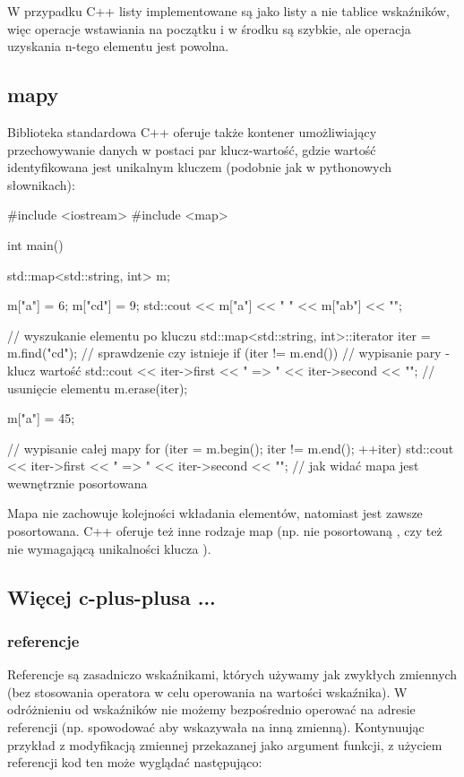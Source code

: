 W przypadku C++ listy implementowane są jako listy a nie tablice wskaźników, więc operacje wstawiania na początku i w środku są szybkie, ale operacja uzyskania n-tego elementu jest powolna.

\subsection{mapy}

Biblioteka standardowa C++ oferuje także kontener umożliwiający przechowywanie danych w postaci par klucz-wartość, gdzie wartość identyfikowana jest unikalnym kluczem (podobnie jak w pythonowych słownikach):

\begin{CodeFrame*}[cpp]{}
#include <iostream>
#include <map>

int main() {
    std::map<std::string, int> m;
    
    m["a"] = 6;
    m["cd"] = 9;
    std::cout << m["a"] << " " << m["ab"] << "\n";
    
    // wyszukanie elementu po kluczu
    std::map<std::string, int>::iterator iter = m.find("cd");
    // sprawdzenie czy istnieje
    if (iter != m.end()) {
        // wypisanie pary - klucz wartość
        std::cout << iter->first << " => " << iter->second << "\n";
        // usunięcie elementu
        m.erase(iter);
    }
    
    m["a"] = 45;
    
    // wypisanie całej mapy
    for (iter = m.begin(); iter != m.end(); ++iter)
        std::cout << iter->first << " => " << iter->second << "\n";
    // jak widać mapa jest wewnętrznie posortowana
}
\end{CodeFrame*}

Mapa  nie zachowuje kolejności wkładania elementów, natomiast jest zawsze posortowana.
C++ oferuje też inne rodzaje map (np. nie posortowaną , czy też nie wymagającą unikalności klucza ).


\subsection{Więcej c-plus-plusa ...}

\subsubsection{referencje}

Referencje są zasadniczo wskaźnikami, których używamy jak zwykłych zmiennych (bez stosowania operatora \cpp{*} w celu operowania na wartości wskaźnika).
W odróżnieniu od wskaźników nie możemy bezpośrednio operować na adresie referencji (np. spowodować aby wskazywała na inną zmienną).
Kontynuując przykład z modyfikacją zmiennej przekazanej jako argument funkcji, z użyciem referencji kod ten może wyglądać następująco:

